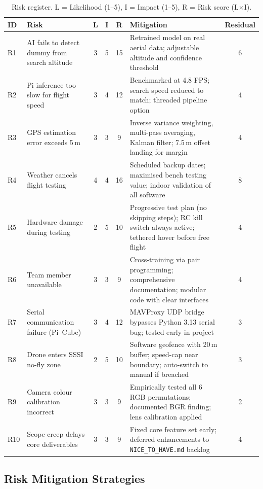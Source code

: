 \begin{table}[htbp]
\centering
\compactTable
\caption{Risk register. L = Likelihood (1--5), I = Impact (1--5), R = Risk score (L$\times$I).}
\label{tab:risks}
\begin{tabularx}{\linewidth}{l X c c c X c}
\toprule
\textbf{ID} & \textbf{Risk} & \textbf{L} & \textbf{I} & \textbf{R} & \textbf{Mitigation} & \textbf{Residual} \\
\midrule
R1 & AI fails to detect dummy from search altitude & 3 & 5 & 15 & Retrained model on real aerial data; adjustable altitude and confidence threshold & 6 \\
R2 & Pi inference too slow for flight speed & 3 & 4 & 12 & Benchmarked at 4.8 FPS; search speed reduced to match; threaded pipeline option & 4 \\
R3 & GPS estimation error exceeds 5\,m & 3 & 3 & 9 & Inverse variance weighting, multi-pass averaging, Kalman filter; 7.5\,m offset landing for margin & 4 \\
R4 & Weather cancels flight testing & 4 & 4 & 16 & Scheduled backup dates; maximised bench testing value; indoor validation of all software & 8 \\
R5 & Hardware damage during testing & 2 & 5 & 10 & Progressive test plan (no skipping steps); RC kill switch always active; tethered hover before free flight & 4 \\
R6 & Team member unavailable & 3 & 3 & 9 & Cross-training via pair programming; comprehensive documentation; modular code with clear interfaces & 4 \\
R7 & Serial communication failure (Pi--Cube) & 3 & 4 & 12 & MAVProxy UDP bridge bypasses Python 3.13 serial bug; tested early in project & 3 \\
R8 & Drone enters SSSI no-fly zone & 2 & 5 & 10 & Software geofence with 20\,m buffer; speed-cap near boundary; auto-switch to manual if breached & 3 \\
R9 & Camera colour calibration incorrect & 3 & 3 & 9 & Empirically tested all 6 RGB permutations; documented BGR finding; lens calibration applied & 2 \\
R10 & Scope creep delays core deliverables & 3 & 3 & 9 & Fixed core feature set early; deferred enhancements to \texttt{NICE\_TO\_HAVE.md} backlog & 4 \\
\bottomrule
\end{tabularx}
\end{table}

\subsection{Risk Mitigation Strategies}

